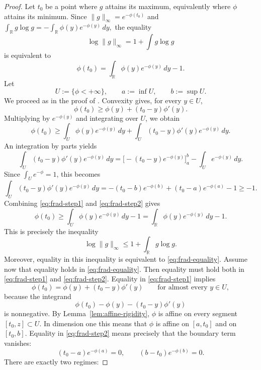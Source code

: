 \documentclass{article}
\theoremstyle{plain}
\theoremstyle{definition}
\newcommand{\1}{\mathbf 1}
\begin{document}
\begin{proof}
Let $t_0$ be a point where $g$ attains its maximum, equivalently where $\phi$
attains its minimum.
Since $\|g\|_\infty=e^{-\phi(t_0)}$ and $
\int_{\mathbb R} g\log g
=
-\int_{\mathbb R}\phi(y)e^{-\phi(y)}\,dy,$ 
the equality
\[
\log\|g\|_\infty = 1+\int g\log g
\]
is equivalent to
\begin{equation}\label{eq:frad-equality}
\phi(t_0)=\int_{\mathbb R}\phi(y)e^{-\phi(y)}\,dy-1.
\end{equation}
Let
\[
U:=\{\phi<+\infty\},
\qquad
a:=\inf U,\qquad b:=\sup U.
\]
We proceed as in the proof of \cite[Theorem 7]{fradelizi2008increasing}. Convexity gives, for every $y\in U$,
\[
\phi(t_0)\ge \phi(y)+(t_0-y)\phi'(y).
\]
Multiplying by $e^{-\phi(y)}$ and integrating over $U$, we obtain
\begin{equation}\label{eq:frad-step1}
\phi(t_0)
\ge
\int_U \phi(y)e^{-\phi(y)}\,dy
+
\int_U (t_0-y)\phi'(y)e^{-\phi(y)}\,dy.
\end{equation}
An integration by parts yields
\[
\int_U (t_0-y)\phi'(y)e^{-\phi(y)}\,dy
=
\Big[-(t_0-y)e^{-\phi(y)}\Big]_{a}^{b}
-\int_U e^{-\phi(y)}\,dy.
\]
Since $\int_U e^{-\phi}=1$, this becomes
\begin{equation}\label{eq:frad-step2}
\int_U (t_0-y)\phi'(y)e^{-\phi(y)}\,dy
=
-(t_0-b)e^{-\phi(b)}+(t_0-a)e^{-\phi(a)}-1
\ge -1.
\end{equation}
Combining \eqref{eq:frad-step1} and \eqref{eq:frad-step2} gives
\[
\phi(t_0)\ge \int_U \phi(y)e^{-\phi(y)}\,dy-1
=
\int_{\mathbb R}\phi(y)e^{-\phi(y)}\,dy-1.
\]
This is precisely the inequality
\[
\log\|g\|_\infty \le 1+\int_{\mathbb R}g\log g.
\]
Moreover, equality in this inequality is equivalent to \eqref{eq:frad-equality}.
Assume now that equality holds in \eqref{eq:frad-equality}. Then equality must
hold both in \eqref{eq:frad-step1} and \eqref{eq:frad-step2}.
Equality in
\eqref{eq:frad-step1} implies
\[
\phi(t_0)=\phi(y)+(t_0-y)\phi'(y)
\qquad\text{for almost every }y\in U,
\]
because the integrand
\[
\phi(t_0)-\phi(y)-(t_0-y)\phi'(y)
\]
is nonnegative. By Lemma~\ref{lem:affine-rigidity}, $\phi$ is affine on every
segment $[t_0,z]\subset U$. In dimension one this means that $\phi$ is affine
on $[a,t_0]$ and on $[t_0,b]$. Equality in \eqref{eq:frad-step2} means precisely that the boundary term vanishes:
\begin{equation}\label{eq:boundary-vanish}
(t_0-a)e^{-\phi(a)}=0,
\qquad
(b-t_0)e^{-\phi(b)}=0.
\end{equation}
There are exactly two regimes:


\end{proof}
\end{document}

